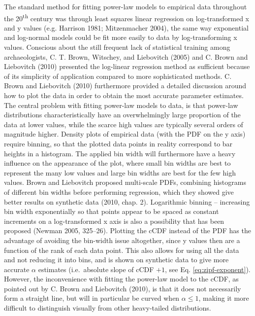 \documentclass[
  12pt,
  a4paper, twoside]{book}
\begin{document}
The standard method for fitting power-law models to empirical data throughout the 20\textsuperscript{th} century was through least squares linear regression on log-transformed x and y values (e.g. Harrison 1981; Mitzenmacher 2004), the same way exponential and log-normal models could be fit more easily to data by log-transforming x values. Conscious about the still frequent lack of statistical training among archaeologists, C. T. Brown, Witschey, and Liebovitch (2005) and C. Brown and Liebovitch (2010) presented the log-linear regression method as sufficient because of its simplicity of application compared to more sophisticated methods. C. Brown and Liebovitch (2010) furthermore provided a detailed discussion around how to plot the data in order to obtain the most accurate parameter estimates. The central problem with fitting power-law models to data, is that power-law distributions characteristically have an overwhelmingly large proportion of the data at lower values, while the scarce high values are typically several orders of magnitude higher. Density plots of empirical data (with the PDF on the y axis) require binning, so that the plotted data points in reality correspond to bar heights in a histogram. The applied bin width will furthermore have a heavy influence on the appearance of the plot, where small bin widths are best to represent the many low values and large bin widths are best for the few high values. Brown and Liebovitch proposed multi-scale PDFs, combining histograms of different bin widths before performing regression, which they showed give better results on synthetic data (2010, chap. 2). Logarithmic binning -- increasing bin width exponentially so that points appear to be spaced as constant increments on a log-transformed x axis is also a possibility that has been proposed (Newman 2005, 325--26). Plotting the cCDF instead of the PDF has the advantage of avoiding the bin-width issue altogether, since y values then are a function of the rank of each data point. This also allows for using all the data and not reducing it into bins, and is shown on synthetic data to give more accurate \(\alpha\) estimates (i.e.~absolute slope of cCDF \(+ 1\), see Eq. \eqref{eq:zipf-exponent}). However, the inconvenience with fitting the power-law model to the cCDF, as pointed out by C. Brown and Liebovitch (2010), is that it does not necessarily form a straight line, but will in particular be curved when \(\alpha \leq 1\), making it more difficult to distinguish visually from other heavy-tailed distributions.
\end{document}
